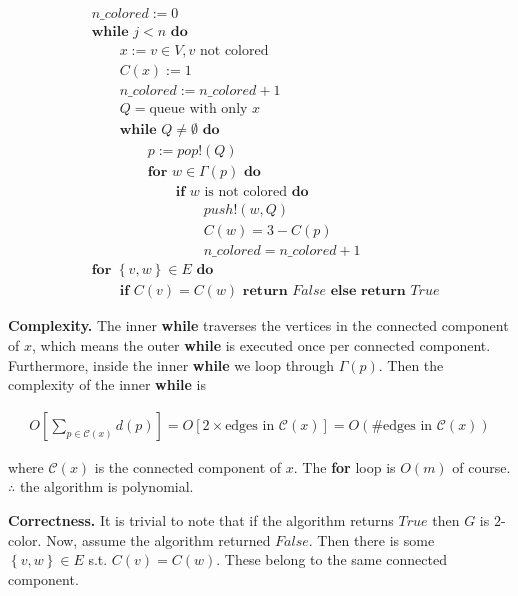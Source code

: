 \documentclass[a4paper, 12pt]{article}
\begin{document}
\begin{align*}
    &n\_colored := 0 \\ 
    &\textbf{while } j < n \textbf{ do }\\ 
    &\qquad x := v \in V, v \text{ not colored} \\ 
    &\qquad C(x) := 1 \\ 
    &\qquad n\_colored :=  n\_colored + 1 \\ 
    & \qquad Q = \text{queue with only } x \\ 
    & \qquad\textbf{while } Q \neq \emptyset \textbf{ do } \\ 
    & \qquad \qquad p := pop!(Q) \\ 
    & \qquad \qquad \textbf{for } w \in \Gamma(p) \textbf{ do } \\ 
    & \qquad\qquad\qquad \textbf{if } w \text{ is not colored } \textbf{do} \\ 
    & \qquad\qquad\qquad\qquad push!(w, Q) \\ 
    & \qquad\qquad\qquad\qquad C(w) = 3 - C(p) \\ 
    & \qquad\qquad\qquad\qquad n\_colored = n\_colored + 1 \\ 
    & \textbf{for } \left\{ v, w \right\} \in  E \textbf{ do }\\ 
    & \qquad\textbf{if } C(v) = C(w) \textbf{ return } False \textbf{ else } \textbf{return } True
\end{align*}

\textbf{Complexity.} The inner \textbf{while} traverses the vertices in the
connected component of $x$, which means the outer \textbf{while} is executed
once per connected component. Furthermore, inside the inner \textbf{while} we
loop through $\Gamma(p)$. Then the complexity of the inner \textbf{while} is 

\begin{align*} O \left[ \sum_{p \in \mathcal{C}(x)} d(p) \right] = O \left[ 2
\times \text{edges in } \mathcal{C}(x) \right]  = O(\# \text{edges in }
\mathcal{C}(x)) \end{align*}

where $\mathcal{C}(x)$ is the connected component of $x$. The \textbf{for} loop
is $O(m)$ of course. $\therefore $ the algorithm is polynomial.

\textbf{Correctness.} It is trivial to note that if the algorithm returns
$True$ then $G$ is $2$-color. Now, assume the algorithm returned $False$. Then
there is some $\left\{ v, w \right\} \in E$ s.t. $C(v) = C(w)$. These belong to
the same connected component.
\end{document}
